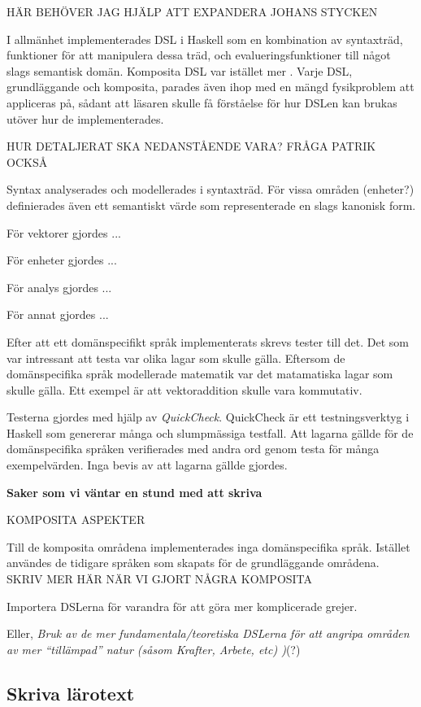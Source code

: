 \begin{binge}
HÄR BEHÖVER JAG HJÄLP ATT EXPANDERA JOHANS STYCKEN

I allmänhet implementerades DSL i Haskell som en kombination av syntaxträd,
funktioner för att manipulera dessa träd, och evalueringsfunktioner till något
slags semantisk domän. Komposita DSL var
istället mer . Varje DSL, grundläggande och komposita,
parades även ihop med en mängd fysikproblem att appliceras på, sådant att
läsaren skulle få förståelse för hur DSLen kan brukas utöver hur de
implementerades.

HUR DETALJERAT SKA NEDANSTÅENDE VARA? FRÅGA PATRIK OCKSÅ

Syntax analyserades och modellerades i syntaxträd. För vissa områden
(enheter?) definierades även ett semantiskt värde som representerade
en slags kanonisk form.

För vektorer gjordes ...

För enheter gjordes ...

För analys gjordes ...

För annat gjordes ...

Efter att ett domänspecifikt språk implementerats skrevs tester till det. Det som var intressant att testa var olika lagar som skulle gälla. Eftersom de domänspecifika språk modellerade matematik var det matamatiska lagar som skulle gälla. Ett exempel är att vektoraddition skulle vara kommutativ.

Testerna gjordes med hjälp av \textit{QuickCheck}. QuickCheck är ett testningsverktyg i Haskell som genererar många och slumpmässiga testfall. Att lagarna gällde för de domänspecifika språken verifierades med andra ord genom testa för många exempelvärden. Inga bevis av att lagarna gällde gjordes.

\textbf{Saker som vi väntar en stund med att skriva}

KOMPOSITA ASPEKTER

Till de komposita områdena implementerades inga domänspecifika språk. Istället användes de tidigare språken som skapats för de grundläggande områdena. SKRIV MER HÄR NÄR VI GJORT NÅGRA KOMPOSITA

Importera DSLerna för varandra för att göra mer komplicerade grejer.

Eller, \emph{Bruk av de mer fundamentala/teoretiska DSLerna för att
  angripa områden av mer ``tillämpad'' natur (såsom Krafter, Arbete,
  etc) )}(?)

\subsection{Skriva lärotext}


\end{binge}
